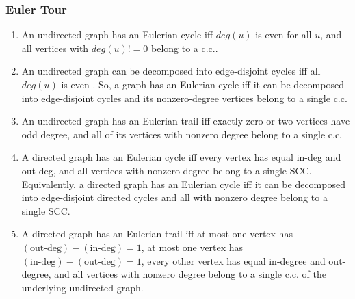 \subsubsection{Euler Tour}
\begin{enumerate}
	\setlength\itemsep{-0.5em}
	\item An undirected graph has an Eulerian cycle iff $deg(u)$ is even for all $u$, and all vertices with $deg(u)!=0$ belong to a c.c..
	\item An undirected graph can be decomposed into edge-disjoint cycles iff all $deg(u)$ is even . So, a graph has an Eulerian cycle iff it can be decomposed into edge-disjoint cycles and its nonzero-degree vertices belong to a single c.c.
	\item An undirected graph has an Eulerian trail iff exactly zero or two vertices have odd degree, and all of its vertices with nonzero degree belong to a single c.c.
	\item A directed graph has an Eulerian cycle iff every vertex has equal in-deg and out-deg, and all vertices with nonzero degree belong to a single SCC. Equivalently, a directed graph has an Eulerian cycle iff it can be decomposed into edge-disjoint directed cycles and all with nonzero degree belong to a single SCC.
	\item A directed graph has an Eulerian trail iff at most one vertex has $(\text{out-deg}) − (\text{in-deg}) = 1$, at most one vertex has $(\text{in-deg}) − (\text{out-deg}) = 1$, every other vertex has equal in-degree and out-degree, and all vertices with nonzero degree belong to a single c.c. of the underlying undirected graph.
\end{enumerate}


